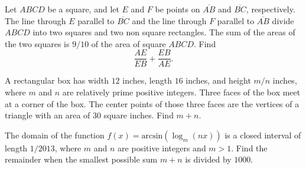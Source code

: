 \documentclass[11pt]{article}
\theoremstyle{definition}
\begin{document}
\begin{question}[name={2013 AIME I, \href{https://artofproblemsolving.com/community/c4p2969807}{Problem 3}}]
	Let $ABCD$ be a square, and let $E$ and $F$ be points on $\overline{AB}$ and $\overline{BC}$, respectively. The line through $E$ parallel to $\overline{BC}$ and the line through $F$ parallel to $\overline{AB}$ divide $ABCD$ into two squares and two non square rectangles. The sum of the areas of the two squares is ${9}/{10}$ of the area of square $ABCD$. Find $$\frac{AE}{EB} + \frac{EB}{AE}.$$
\end{question}


%	










\begin{question}[name={2013 AIME I, \href{https://artofproblemsolving.com/community/c4p2969814}{Problem 7}}]
	A rectangular box has width $12$ inches, length $16$ inches, and height ${m}/{n}$ inches, where $m$ and $n$ are relatively prime positive integers. Three faces of the box meet at a corner of the box. The center points of those three faces are the vertices of a triangle with an area of $30$ square inches. Find $m+n$.
\end{question}


%	












\begin{question}[name={2013 AIME I, \href{https://artofproblemsolving.com/community/c4p2969815}{Problem 8}}]
	The domain of the function $f(x) = \text{arcsin}(\log_{m}(nx))$ is a closed interval of length ${1}/{2013}$, where $m$ and $n$ are positive integers and $m > 1$. Find the remainder when the smallest possible sum $m+n$ is divided by $1000$.
\end{question}


%	
\end{document}
